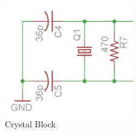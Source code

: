 \begin{figure}[h]
\centering
\includegraphics[width=0.5\textwidth]{reliability-analysis/functional-breakdown-crystal.png}
\caption{Crystal Block}
\label{fig:crystal-block}
\end{figure}

